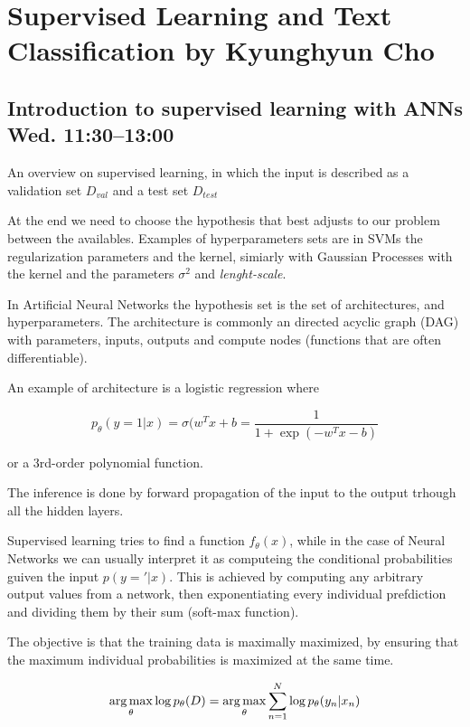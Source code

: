 \documentclass[b5paper]{report}
\begin{document}
\chapter{Supervised Learning and Text Classification by Kyunghyun Cho}

\section{Introduction to supervised learning with ANNs Wed.  11:30--13:00}

An overview on supervised learning, in which the input is described as a
validation set $D_{val}$ and a test set $D_{test}$

At the end we need to choose the hypothesis that best adjusts to our problem
between the availables. Examples of hyperparameters sets are in SVMs the
regularization parameters and the kernel, simiarly with Gaussian Processes with
the kernel and the parameters $\sigma^2$ and \emph{lenght-scale}.

In Artificial Neural Networks the hypothesis set is the set of architectures,
and hyperparameters. The architecture is commonly an directed acyclic graph
(DAG) with parameters, inputs, outputs and compute nodes (functions that are
often differentiable).

An example of architecture is a logistic regression where

\begin{equation}
  p_\theta(y=1|x) = \sigma(w^T x + b = \frac{1}{1 + \exp(-w^T x - b)}
\end{equation}

or a 3rd-order polynomial function.

The inference is done by forward propagation of the input to the output trhough
all the hidden layers.

Supervised learning tries to find a function $f_\theta(x)$, while in the case
of Neural Networks we can usually interpret it as computeing the conditional
probabilities guiven the input $p(y='|x)$. This is achieved by computing any
arbitrary output values from a network, then exponentiating every individual
prefdiction and dividing them by their sum (soft-max function).

The objective is that the training data is maximally maximized, by ensuring
that the maximum individual probabilities is maximized at the same time.

\begin{equation}
  \operatorname*{arg\,max}_\theta \log p_\theta(D) = \operatorname*{arg\,max}_\theta \sum_{n=1}^N \log
  p_\theta(y_n|x_n)
\end{equation}
\end{document}
